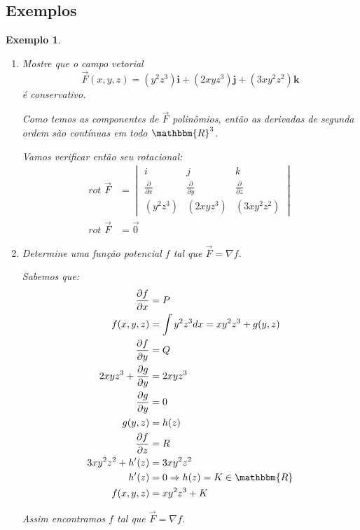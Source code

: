 \documentclass{article}
\newcommand{\REAL}{\mathbbm{R}}
\newcommand{\PartialDer}[2] {\frac{\partial #1}{\partial #2}}
\newcommand{\FVett}[3] {\left(#1\right) \textbf{i} + \left(#2\right) \textbf{j} + \left(#3\right) \textbf {k}}
\newcommand{\Rot}[0] {\textit{rot }}
\newtheorem{example}{Exemplo}[section]
\begin{document}
        \subsection{Exemplos}
            \begin{example}
                \begin{enumerate}
                    \item
                        Mostre que o campo vetorial
                        \[
                            \vec{F}(x,y,z) = \FVett{y^2z^3}{2xyz^3}{3xy^2z^2}
                        \]
                        é conservativo.

                        Como temos as componentes de $\vec{F}$ polinômios, então as derivadas de segunda ordem são contínuas
                        em todo $\REAL^3$.

                        Vamos verificar então seu rotacional:
                        \begin{align*}
                            \Rot \vec{F} &= \begin{vmatrix}
                                            i&j&k\\
                                            \PartialDer{}{x}&\PartialDer{}{y}&\PartialDer{}{z}\\
                                            (y^2z^3) & (2xyz^3) & (3xy^2z^2)
                                            \end{vmatrix}\\
                            \Rot \vec{F} &= \vec{0}
                        \end{align*}

                    \item
                        Determine uma função potencial $f$ tal que $\vec{F} = \nabla f$.

                        Sabemos que:
                        \begin{align*}
                            \PartialDer{f}{x} &= P\\
                            f(x,y,z) &= \int y^2z^3 dx = xy^2z^3 + g(y, z)\\
                            \PartialDer{f}{y} &= Q\\
                            2xyz^3 + \PartialDer{g}{y} &= 2xyz^3\\
                            \PartialDer{g}{y} &= 0\\
                            g(y, z) &= h(z)\\
                            \PartialDer{f}{z} &= R\\
                            3xy^2z^2 + h^\prime (z) &= 3xy^2z^2\\
                            h^\prime(z) &= 0 \Rightarrow h(z) = K \in \REAL\\
                            f(x,y,z) &= xy^2z^3 + K
                        \end{align*}

                        Assim encontramos $f$ tal que $\vec{F} = \nabla f$.
                \end{enumerate}
            \end{example}
\end{document}

